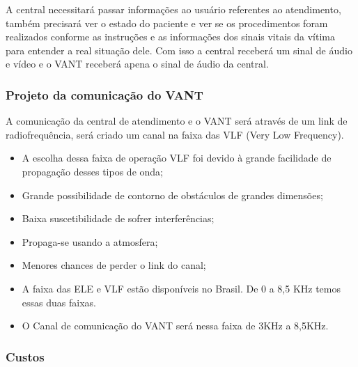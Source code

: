 A central necessitará passar informações ao usuário referentes ao atendimento, também precisará ver o estado do paciente e ver se os procedimentos foram realizados conforme as instruções e as informações dos sinais vitais da vítima para entender a real situação dele. Com isso a central receberá um sinal de áudio e vídeo e o VANT receberá apena o sinal de áudio da central. 

\subsubsection{Projeto da comunicação do VANT}
A comunicação da central de atendimento e o VANT será através de um link de radiofrequência, será criado um canal na faixa das VLF (Very Low Frequency).

\begin{itemize}
	\item A escolha dessa faixa de operação VLF foi devido à grande facilidade de propagação desses tipos de onda;
	\item Grande possibilidade de contorno de obstáculos de grandes dimensões;
	\item Baixa suscetibilidade de sofrer interferências;
	\item Propaga-se usando a atmosfera;
	\item Menores chances de perder o link do canal;
	\item A faixa das ELE e VLF estão disponíveis no Brasil. De 0 a 8,5 KHz temos essas duas faixas.
	\item O Canal de comunicação do VANT será nessa faixa de 3KHz a 8,5KHz.
\end{itemize}

\pagebreak

\subsubsection{Custos}


